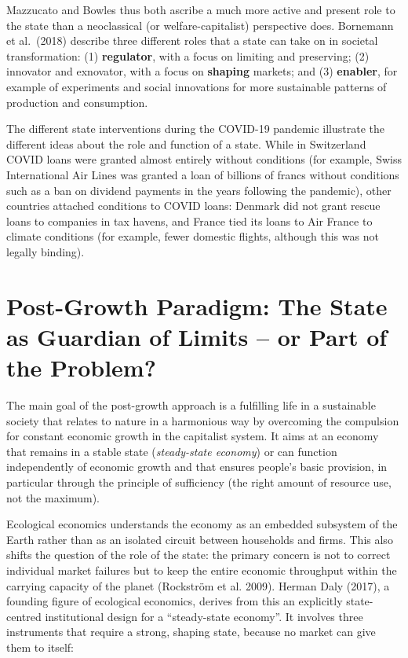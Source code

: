 \documentclass[
  british,
  a4paper,
  DIV=11,
  numbers=noendperiod,
  oneside,
  openany]{scrreprt}
\begin{document}
Mazzucato and Bowles thus both ascribe a much more active and present
role to the state than a neoclassical (or welfare-capitalist)
perspective does. Bornemann et al.~(2018) describe three different roles
that a state can take on in societal transformation: (1)
\textbf{regulator}, with a focus on limiting and preserving; (2)
innovator and exnovator, with a focus on \textbf{shaping} markets; and
(3) \textbf{enabler}, for example of experiments and social innovations
for more sustainable patterns of production and consumption.

The different state interventions during the COVID-19 pandemic
illustrate the different ideas about the role and function of a state.
While in Switzerland COVID loans were granted almost entirely without
conditions (for example, Swiss International Air Lines was granted a
loan of billions of francs without conditions such as a ban on dividend
payments in the years following the pandemic), other countries attached
conditions to COVID loans: Denmark did not grant rescue loans to
companies in tax havens, and France tied its loans to Air France to
climate conditions (for example, fewer domestic flights, although this
was not legally binding).

\section{Post-Growth Paradigm: The State as Guardian of Limits -- or
Part of the
Problem?}\label{post-growth-paradigm-the-state-as-guardian-of-limits-or-part-of-the-problem}

The main goal of the post-growth approach is a fulfilling life in a
sustainable society that relates to nature in a harmonious way by
overcoming the compulsion for constant economic growth in the capitalist
system. It aims at an economy that remains in a stable state
(\emph{steady-state economy}) or can function independently of economic
growth and that ensures people's basic provision, in particular through
the principle of sufficiency (the right amount of resource use, not the
maximum).

Ecological economics understands the economy as an embedded subsystem of
the Earth rather than as an isolated circuit between households and
firms. This also shifts the question of the role of the state: the
primary concern is not to correct individual market failures but to keep
the entire economic throughput within the carrying capacity of the
planet (Rockström et al. 2009). Herman Daly (2017), a founding figure of
ecological economics, derives from this an explicitly state-centred
institutional design for a ``steady-state economy''. It involves three
instruments that require a strong, shaping state, because no market can
give them to itself:
\end{document}
